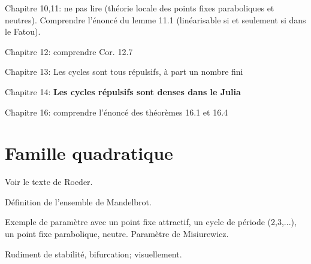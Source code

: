 \documentclass{article}
\begin{document}
Chapitre 10,11: ne pas lire (théorie locale des points fixes paraboliques et
neutres). Comprendre l'énoncé du lemme 11.1 (linéarisable si et seulement si
dans le Fatou).

Chapitre 12: comprendre Cor. 12.7

Chapitre 13: Les cycles sont tous répulsifs, à part un nombre fini

Chapitre 14: \textbf{Les cycles répulsifs sont denses dans le Julia}

Chapitre 16: comprendre l'énoncé des théorèmes 16.1 et 16.4

\section{Famille quadratique}

Voir le texte de Roeder.

Définition de l'ensemble de Mandelbrot.

Exemple de paramètre avec un point fixe attractif, un cycle de période
(2,3,...), un point fixe parabolique, neutre. Paramètre de Misiurewicz.

Rudiment de stabilité, bifurcation; visuellement.
\end{document}
